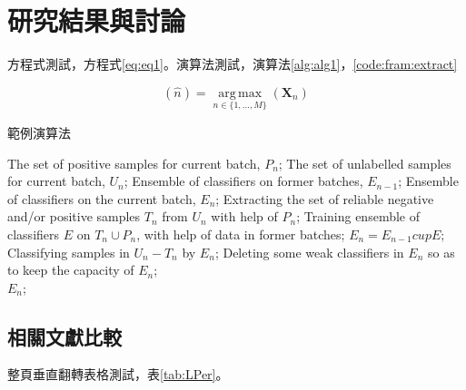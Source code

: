 \section{研究結果與討論}

方程式測試，方程式\ref{eq:eq1}。演算法測試，演算法\ref{alg:alg1}，\ref{code:fram:extract}

\begin{equation}[h]
    \label{eq:eq1}
    (\hat{n})=\operatorname*{arg\,max}_{n\in \{1,\dots,M\}}(\mathbf{X}_{n})
\end{equation}

\begin{algorithm}[htb]
    \caption{範例演算法}
    \label{alg:alg1}
    \begin{algorithmic}[1]
        \Require
        The set of positive samples for current batch, $P_n$;
        The set of unlabelled samples for current batch, $U_n$;
        Ensemble of classifiers on former batches, $E_{n-1}$;
        \Ensure
        Ensemble of classifiers on the current batch, $E_n$;
        \State Extracting the set of reliable negative and/or positive samples $T_n$ from $U_n$ with help of $P_n$;
        \label{code:fram:extract}
        \State Training ensemble of classifiers $E$ on $T_n \cup P_n$, with help of data in former batches;
        \label{code:fram:trainbase}
        \State $E_n=E_{n-1}cup E$;
        \label{code:fram:add}
        \State Classifying samples in $U_n-T_n$ by $E_n$;
        \label{code:fram:classify}
        \State Deleting some weak classifiers in $E_n$ so as to keep the capacity of $E_n$;
        \label{code:fram:select} \\
        \Return $E_n$;
    \end{algorithmic}
\end{algorithm}

\subsection{相關文獻比較}
整頁垂直翻轉表格測試，表\ref{tab:LPer}。

